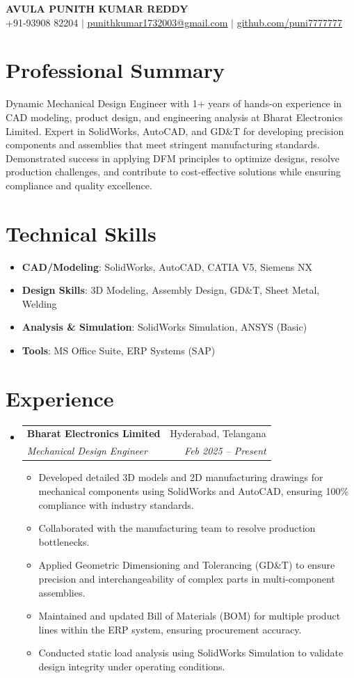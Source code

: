 \documentclass[letterpaper,11pt]{article}
\makeatletter
\newcommand{\resumeItem}[1]{
  \item\small{
    {#1 \vspace{-2pt}}
  }
}
\newcommand{\resumeSubheading}[4]{
  \vspace{-2pt}\item
    \begin{tabular*}{0.97\textwidth}[t]{l@{\extracolsep{\fill}}r}
      \textbf{#1} & #2 \\
      \textit{\small#3} & \textit{\small #4} \\
    \end{tabular*}\vspace{-7pt}
}
\newcommand{\resumeSubHeadingListStart}{\begin{itemize}[leftmargin=0.15in, label={}]}
\newcommand{\resumeSubHeadingListEnd}{\end{itemize}}
\newcommand{\resumeItemListStart}{\begin{itemize}}
\newcommand{\resumeItemListEnd}{\end{itemize}\vspace{-5pt}}
\makeatother
\begin{document}
\begin{center}
    \textbf{\Huge AVULA PUNITH KUMAR REDDY} \\ \vspace{1pt}
    \small +91-93908 82204 $|$ \href{mailto:punithkumar1732003@gmail.com}{\underline{punithkumar1732003@gmail.com}} $|$ 
    \href{https://github.com/puni7777777}{\underline{github.com/puni7777777}}
\end{center}

\section{Professional Summary}
Dynamic Mechanical Design Engineer with 1+ years of hands-on experience in CAD modeling, product design, and engineering analysis at Bharat Electronics Limited. Expert in SolidWorks, AutoCAD, and GD\&T for developing precision components and assemblies that meet stringent manufacturing standards. Demonstrated success in applying DFM principles to optimize designs, resolve production challenges, and contribute to cost-effective solutions while ensuring compliance and quality excellence.

\section{Technical Skills}
  \resumeItemListStart
    \resumeItem{\textbf{CAD/Modeling}: SolidWorks, AutoCAD, CATIA V5, Siemens NX}
    \resumeItem{\textbf{Design Skills}: 3D Modeling, Assembly Design, GD\&T, Sheet Metal, Welding}
    \resumeItem{\textbf{Analysis \& Simulation}: SolidWorks Simulation, ANSYS (Basic)}
    \resumeItem{\textbf{Tools}: MS Office Suite, ERP Systems (SAP)}
  \resumeItemListEnd

\section{Experience}
  \resumeSubHeadingListStart
    \resumeSubheading
      {Bharat Electronics Limited}{Hyderabad, Telangana}
      {Mechanical Design Engineer}{Feb 2025 -- Present}

      \resumeItemListStart
        \resumeItem{Developed detailed 3D models and 2D manufacturing drawings for mechanical components using SolidWorks and AutoCAD, ensuring 100\% compliance with industry standards.}
        \resumeItem{Collaborated with the manufacturing team to resolve production bottlenecks.}
        \resumeItem{Applied Geometric Dimensioning and Tolerancing (GD\&T) to ensure precision and interchangeability of complex parts in multi-component assemblies.}
        \resumeItem{Maintained and updated Bill of Materials (BOM) for multiple product lines within the ERP system, ensuring procurement accuracy.}
        \resumeItem{Conducted static load analysis using SolidWorks Simulation to validate design integrity under operating conditions.}
      \resumeItemListEnd
  \resumeSubHeadingListEnd
\end{document}
